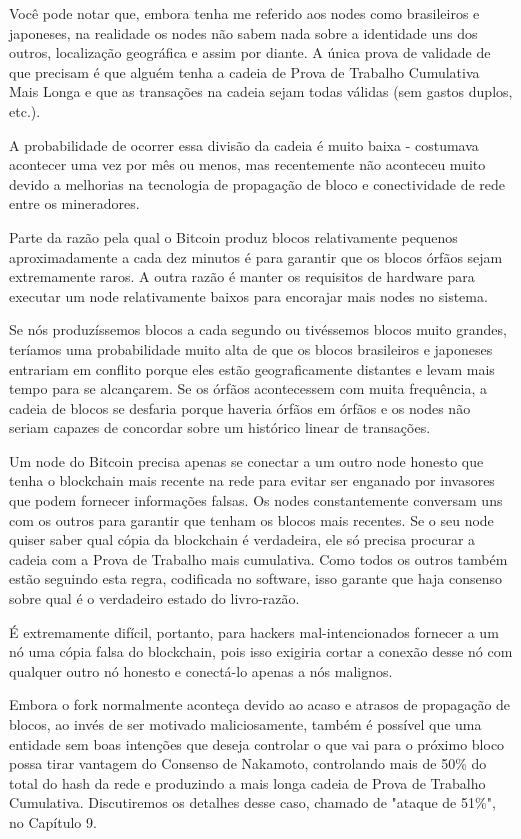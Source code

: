 Você pode notar que, embora tenha me referido aos nodes como brasileiros e japoneses, na realidade os nodes não sabem nada sobre a identidade uns dos outros, localização geográfica e assim por diante. A única prova de validade de que precisam é que alguém tenha a cadeia de Prova de Trabalho Cumulativa Mais Longa e que as transações na cadeia sejam todas válidas (sem gastos duplos, etc.).

A probabilidade de ocorrer essa divisão da cadeia é muito baixa - costumava acontecer uma vez por mês ou menos, mas recentemente não aconteceu muito devido a melhorias na tecnologia de propagação de bloco e conectividade de rede entre os mineradores.

Parte da razão pela qual o Bitcoin produz blocos relativamente pequenos aproximadamente a cada dez minutos é para garantir que os blocos órfãos sejam extremamente raros. A outra razão é manter os requisitos de hardware para executar um node relativamente baixos para encorajar mais nodes no sistema.

Se nós produzíssemos blocos a cada segundo ou tivéssemos blocos muito grandes, teríamos uma probabilidade muito alta de que os blocos brasileiros e japoneses entrariam em conflito porque eles estão geograficamente distantes e levam mais tempo para se alcançarem. Se os órfãos acontecessem com muita frequência, a cadeia de blocos se desfaria porque haveria órfãos em órfãos e os nodes não seriam capazes de concordar sobre um histórico linear de transações.

Um node do Bitcoin precisa apenas se conectar a um outro node honesto que tenha o blockchain mais recente na rede para evitar ser enganado por invasores que podem fornecer informações falsas. Os nodes constantemente conversam uns com os outros para garantir que tenham os blocos mais recentes. Se o seu node quiser saber qual cópia da blockchain é verdadeira, ele só precisa procurar a cadeia com a Prova de Trabalho mais cumulativa. Como todos os outros também estão seguindo esta regra, codificada no software, isso garante que haja consenso sobre qual é o verdadeiro estado do livro-razão.

É extremamente difícil, portanto, para hackers mal-intencionados fornecer a um nó uma cópia falsa do blockchain, pois isso exigiria cortar a conexão desse nó com qualquer outro nó honesto e conectá-lo apenas a nós malignos.

Embora o fork normalmente aconteça devido ao acaso e atrasos de propagação de blocos, ao invés de ser motivado maliciosamente, também é possível que uma entidade sem boas intenções que deseja controlar o que vai para o próximo bloco possa tirar vantagem do Consenso de Nakamoto, controlando mais de 50\% do total do hash da rede e produzindo a mais longa cadeia de Prova de Trabalho Cumulativa. Discutiremos os detalhes desse caso, chamado de "ataque de 51\%", no Capítulo 9.

